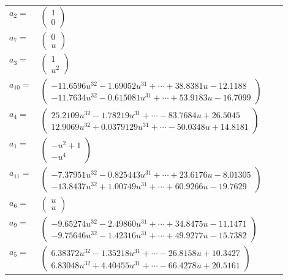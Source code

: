 \documentclass[1p]{elsarticle_modified}
\theoremstyle{definition}
\begin{document}
\begin{tabular}{m{7pt} m{180pt} m{7pt} m{180pt} }
\flushright $a_{2}=$&$\begin{pmatrix}1\\0\end{pmatrix}$ \\
\flushright $a_{7}=$&$\begin{pmatrix}0\\u\end{pmatrix}$ \\
\flushright $a_{3}=$&$\begin{pmatrix}1\\u^2\end{pmatrix}$ \\
\flushright $a_{10}=$&$\begin{pmatrix}-11.6596 u^{32}-1.69052 u^{31}+\cdots+38.8381 u-12.1188\\-11.7634 u^{32}-0.615081 u^{31}+\cdots+53.9183 u-16.7099\end{pmatrix}$ \\
\flushright $a_{4}=$&$\begin{pmatrix}25.2109 u^{32}-1.78219 u^{31}+\cdots-83.7684 u+26.5045\\12.9069 u^{32}+0.0379129 u^{31}+\cdots-50.0348 u+14.8181\end{pmatrix}$ \\
\flushright $a_{1}=$&$\begin{pmatrix}- u^2+1\\- u^4\end{pmatrix}$ \\
\flushright $a_{11}=$&$\begin{pmatrix}-7.37951 u^{32}-0.825443 u^{31}+\cdots+23.6176 u-8.01305\\-13.8437 u^{32}+1.00749 u^{31}+\cdots+60.9266 u-19.7629\end{pmatrix}$ \\
\flushright $a_{6}=$&$\begin{pmatrix}u\\u\end{pmatrix}$ \\
\flushright $a_{9}=$&$\begin{pmatrix}-9.65274 u^{32}-2.49860 u^{31}+\cdots+34.8475 u-11.1471\\-9.75646 u^{32}-1.42316 u^{31}+\cdots+49.9277 u-15.7382\end{pmatrix}$ \\
\flushright $a_{5}=$&$\begin{pmatrix}6.38372 u^{32}-1.35218 u^{31}+\cdots-26.8158 u+10.3427\\6.83048 u^{32}+4.40455 u^{31}+\cdots-66.4278 u+20.5161\end{pmatrix}$ \\

\end{tabular}
\end{document}
